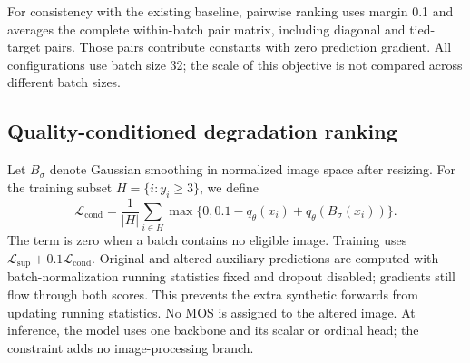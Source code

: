 \documentclass[11pt]{article}
\begin{document}
For consistency with the existing baseline, pairwise ranking uses margin 0.1 and averages the complete within-batch pair matrix, including diagonal and tied-target pairs. Those pairs contribute constants with zero prediction gradient. All configurations use batch size 32; the scale of this objective is not compared across different batch sizes.

\subsection{Quality-conditioned degradation ranking}
Let $B_\sigma$ denote Gaussian smoothing in normalized image space after resizing. For the training subset $H=\{i:y_i\geq3\}$, we define
\begin{equation}
 \mathcal L_{\mathrm{cond}}=\frac{1}{|H|}\sum_{i\in H}
 \max\{0,0.1-q_\theta(x_i)+q_\theta(B_\sigma(x_i))\}.
\end{equation}
The term is zero when a batch contains no eligible image. Training uses $\mathcal L_{\mathrm{sup}}+0.1\mathcal L_{\mathrm{cond}}$. Original and altered auxiliary predictions are computed with batch-normalization running statistics fixed and dropout disabled; gradients still flow through both scores. This prevents the extra synthetic forwards from updating running statistics. No MOS is assigned to the altered image. At inference, the model uses one backbone and its scalar or ordinal head; the constraint adds no image-processing branch.
\end{document}

